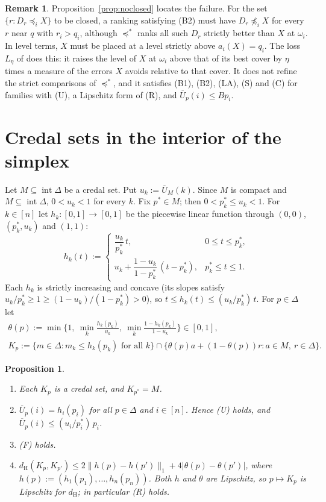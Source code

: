 \documentclass[11pt]{article}
\newtheorem{proposition}[theorem]{Proposition}
\theoremstyle{definition}
\newtheorem{remark}[theorem]{Remark}
\newcommand{\dH}{d_{\mathrm H}}
\newcommand{\Ub}{\overline U}
\newcommand{\ws}{\preceq^{*}}
\begin{document}
\begin{remark}\label{rem:lift}
Proposition~\ref{prop:noclosed} locates the failure. For the set $\{r:D_r\preceq_iX\}$ to be closed, a ranking satisfying (B2) must have $D_r\not\preceq_iX$ for every $r$ near $q$ with $r_i>q_i$, although $\ws$ ranks all such $D_r$ strictly better than $X$ at $\omega_i$. In level terms, $X$ must be placed at a level strictly above $a_i(X)=q_i$. The loss $L_\eta$ of \cite[Theorem~2.2]{LR} does this: it raises the level of $X$ at $\omega_i$ above that of its best cover by $\eta$ times a measure of the errors $X$ avoids relative to that cover. It does not refine the strict comparisons of $\ws$, and it satisfies (B1), (B2), (LA), (S) and (C) for families with (U), a Lipschitz form of (R), and $\Ub_p(i)\le Bp_i$.
\end{remark}

\section{Credal sets in the interior of the simplex}\label{sec:interior}

Let $M\subseteq\operatorname{int}\Delta$ be a credal set. Put $u_k:=\Ub_M(k)$. Since $M$ is compact and $M\subseteq\operatorname{int}\Delta$, $0<u_k<1$ for every $k$. Fix $p^*\in M$; then $0<p^*_k\le u_k<1$. For $k\in[n]$ let $h_k:[0,1]\to[0,1]$ be the piecewise linear function through $(0,0)$, $(p^*_k,u_k)$ and $(1,1)$:
\[
h_k(t):=\begin{cases}\dfrac{u_k}{p^*_k}\,t,&0\le t\le p^*_k,\\[6pt] u_k+\dfrac{1-u_k}{1-p^*_k}\,(t-p^*_k),&p^*_k\le t\le1.\end{cases}
\]
Each $h_k$ is strictly increasing and concave (its slopes satisfy $u_k/p^*_k\ge1\ge(1-u_k)/(1-p^*_k)>0$), so $t\le h_k(t)\le(u_k/p^*_k)\,t$. For $p\in\Delta$ let
\begin{gather*}
\theta(p):=\min\Big\{1,\ \min_k\frac{h_k(p_k)}{u_k},\ \min_k\frac{1-h_k(p_k)}{1-u_k}\Big\}\in[0,1],\\
K_p:=\{m\in\Delta:m_k\le h_k(p_k)\text{ for all }k\}\cap\{\theta(p)a+(1-\theta(p))r:a\in M,\ r\in\Delta\}.
\end{gather*}

\begin{proposition}\label{prop:family}
\begin{enumerate}[label=(\roman*)]
\item Each $K_p$ is a credal set, and $K_{p^*}=M$.
\item $\Ub_p(i)=h_i(p_i)$ for all $p\in\Delta$ and $i\in[n]$. Hence (U) holds, and $\Ub_p(i)\le(u_i/p^*_i)\,p_i$.
\item (F) holds.
\item $\dH(K_p,K_{p'})\le2\|h(p)-h(p')\|_1+4|\theta(p)-\theta(p')|$, where $h(p):=(h_1(p_1),\dots,h_n(p_n))$. Both $h$ and $\theta$ are Lipschitz, so $p\mapsto K_p$ is Lipschitz for $\dH$; in particular (R) holds.
\end{enumerate}
\end{proposition}
\end{document}
